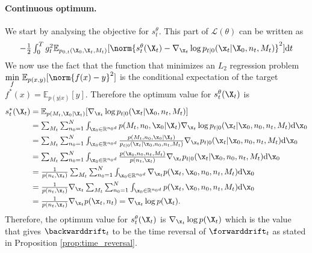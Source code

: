 \paragraph{Continuous optimum.} We start by analysing the objective for
$s_t^\theta$. This part of $\mathcal{L}(\theta)$ can be written as
\begin{equation}
  \textstyle 
    -\frac{1}{2} \int_{0}^T g_t^2 \mathbb{E}_{p_{0,t}(\X_0, \X_t, M_t)} [ \norm{s_t^\theta(\X_t) - \nabla_{\x_t} \log p_{t|0}(\x_t | \X_0, n_t, M_t) }^2 ] \rmd t
\end{equation}
We now use the fact that the function that minimizes an $L_2$ regression problem $\underset{f}{\text{min}} \,\, \mathbb{E}_{p(x, y)} [ \norm{f(x) - y}^2 ]$ is the conditional expectation of the target $f^*(x) = \mathbb{E}_{p(y|x)} [ y]$. Therefore the optimum value for $s_t^\theta(\X_t)$ is
\begin{align}
    s_t^*(\X_t) &\textstyle = \mathbb{E}_{p(M_t, \X_0 | \X_t)} [ \nabla_{\x_t} \log p_{t|0}(\x_t | \X_0, n_t, M_t) ]\\
    &\textstyle = \sum_{M_t} \intxz p(M_t, n_0, \x_0 | \X_t) \nabla_{\x_t} \log p_{t|0}(\x_t | \x_0, n_0, n_t, M_t) \rmd \x_0\\
    &\textstyle = \sum_{M_t} \intxz \frac{p(M_t, n_0, \x_0 | \X_t)}{p_{t|0}(\x_t | \x_0, n_0, n_t, M_t)} \nabla_{\x_t} p_{t|0}(\x_t | \x_0, n_0, n_t, M_t) \rmd \x_0\\
    &\textstyle = \sum_{M_t} \intxz \frac{p(\x_0, n_0, n_t, M_t)}{p(n_t, \x_t)} \nabla_{\x_t} p_{t|0}(\x_t | \x_0, n_0, n_t, M_t) \rmd \x_0\\
    &\textstyle = \frac{1}{p(n_t, \x_t)} \sum_{M_t} \intxz  \nabla_{\x_t} p(\x_t, \x_0, n_0, n_t, M_t) \rmd \x_0\\
    &\textstyle = \frac{1}{p(n_t, \x_t)} \nabla_{\x_t} \sum_{M_t} \intxz  p(\x_t, \x_0, n_0, n_t, M_t) \rmd \x_0\\
    &\textstyle = \frac{1}{p(n_t, \x_t)} \nabla_{\x_t} p(\x_t, n_t) \textstyle = \nabla_{\x_t}\log p(\X_t) . 
\end{align}
Therefore, the optimum value for $s_t^\theta(\X_t)$ is $\nabla_{\x_t} \log p(\X_t)$ which is the value that gives $\backwarddrift_t$ to be the time reversal of $\forwarddrift_t$ as stated in Proposition \ref{prop:time_reversal}.\\

